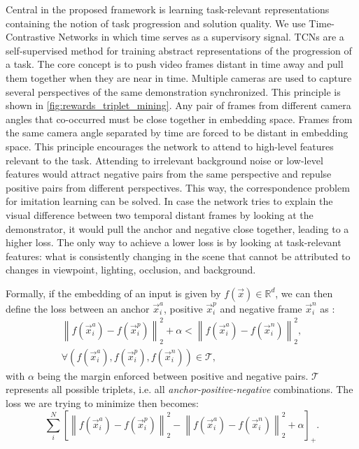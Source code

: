 \documentclass[\home/main.tex]{subfiles}
\begin{document}
Central in the proposed framework is learning task-relevant representations containing the notion of task progression and solution quality. We use Time-Contrastive Networks \autocite{Sermanet2017TCN} in which time serves as a supervisory signal. TCNs are a self-supervised method for training abstract representations of the progression of a task. The core concept is to push video frames distant in time away and pull them together when they are near in time. Multiple cameras are used to capture several perspectives of the same demonstration synchronized. This principle is shown in \cref{fig:rewards_triplet_mining}. Any pair of frames from different camera angles that co-occurred must be close together in embedding space. Frames from the same camera angle separated by time are forced to be distant in embedding space. This principle encourages the network to attend to high-level features relevant to the task.
Attending to irrelevant background noise or low-level features would attract negative pairs from the same perspective and repulse positive pairs from different perspectives. This way, the correspondence problem \autocite{BrassHeyes2005} for imitation learning can be solved. In case the network tries to explain the visual difference between two temporal distant frames by looking at the demonstrator, it would pull the anchor and negative close together, leading to a higher loss. The only way to achieve a lower loss is by looking at task-relevant features: what is consistently changing in the scene that cannot be attributed to changes in viewpoint, lighting, occlusion, and background.

Formally, if the embedding of an input is given by $f(\vec{x}) \in \mathbb{R}^d$, we can then define the loss between an anchor $\vec{x}_i^a$, positive $\vec{x}_i^p$ and negative frame $\vec{x}_i^n$ as \autocite{FaceNet}:
\begin{align}
    \left\|f\left(\vec{x}_{i}^{a}\right)-f\left(\vec{x}_{i}^{p}\right)\right\|_{2}^{2}+\alpha<\left\|f\left(\vec{x}_{i}^{a}\right)-f\left(\vec{x}_{i}^{n}\right)\right\|_{2}^{2} \nonumber, \\
    \forall\left(f\left(\vec{x}_{i}^{a}\right), f\left(\vec{x}_{i}^{p}\right), f\left(\vec{x}_{i}^{n}\right)\right) \in \mathcal{T},    \nonumber
\end{align}
with $\alpha$ being the margin enforced between positive and negative pairs. $\mathcal{T}$ represents all possible triplets, i.e. all \textit{anchor-positive-negative} combinations. The loss we are trying to minimize then becomes:
\begin{equation*}
    \sum_{i}^{N}\left[\left\|f\left(\vec{x}_{i}^{a}\right)-f\left(\vec{x}_{i}^{p}\right)\right\|_{2}^{2}-\left\|f\left(\vec{x}_{i}^{a}\right)-f\left(\vec{x}_{i}^{n}\right)\right\|_{2}^{2}+\alpha\right]_{+}.
\end{equation*}
\end{document}
